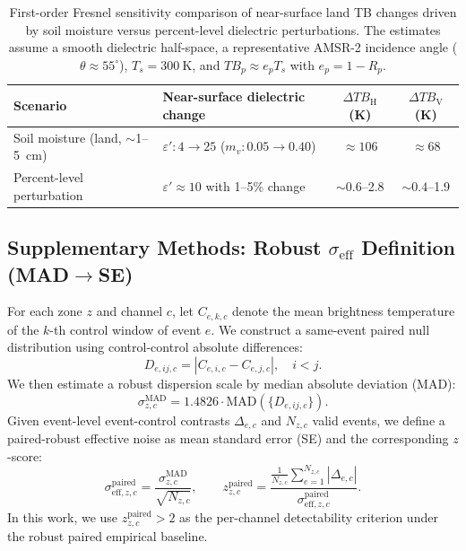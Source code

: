 \documentclass[preprint,review,12pt,authoryear]{elsarticle}
\begin{document}
\begin{table}[p]
\footnotesize
\centering
\caption{First-order Fresnel sensitivity comparison of near-surface land TB changes driven by soil moisture versus percent-level dielectric perturbations. The estimates assume a smooth dielectric half-space, a representative AMSR-2 incidence angle ($\theta \approx 55^{\circ}$), $T_s = 300~\mathrm{K}$, and $TB_p \approx e_p T_s$ with $e_p = 1 - R_p$.}
\label{tab:tableS5}
\begin{tabular}{@{}llcc@{}}
\toprule
Scenario & Near-surface dielectric change & $\Delta TB_{\mathrm{H}}$ (K) & $\Delta TB_{\mathrm{V}}$ (K) \\
\midrule
Soil moisture (land, $\sim$1--5~cm) & $\varepsilon': 4 \rightarrow 25$ ($m_v: 0.05 \rightarrow 0.40$) & $\approx 106$ & $\approx 68$ \\
Percent-level perturbation & $\varepsilon' \approx 10$ with 1--5\% change & $\sim 0.6$--2.8 & $\sim 0.4$--1.9 \\
\bottomrule
\end{tabular}
\end{table}
\clearpage


\clearpage


\clearpage

\subsection*{Supplementary Methods: Robust $\sigma_{\mathrm{eff}}$ Definition (MAD$\rightarrow$SE)}
For each zone $z$ and channel $c$, let $C_{e,k,c}$ denote the mean brightness temperature of the $k$-th control window of event $e$. We construct a same-event paired null distribution using control-control absolute differences:
\begin{equation}
D_{e,ij,c}=\left|C_{e,i,c}-C_{e,j,c}\right|,\quad i<j.
\end{equation}
We then estimate a robust dispersion scale by median absolute deviation (MAD):
\begin{equation}
\sigma^{\mathrm{MAD}}_{z,c}=1.4826\cdot \mathrm{MAD}\!\left(\{D_{e,ij,c}\}\right).
\end{equation}
Given event-level event-control contrasts $\Delta_{e,c}$ and $N_{z,c}$ valid events, we define a paired-robust effective noise as mean standard error (SE) and the corresponding $z$-score:
\begin{equation}
\sigma^{\mathrm{paired}}_{\mathrm{eff},z,c}=\frac{\sigma^{\mathrm{MAD}}_{z,c}}{\sqrt{N_{z,c}}},\qquad
z^{\mathrm{paired}}_{z,c}=\frac{\frac{1}{N_{z,c}}\sum_{e=1}^{N_{z,c}}\left|\Delta_{e,c}\right|}{\sigma^{\mathrm{paired}}_{\mathrm{eff},z,c}}.
\end{equation}
In this work, we use $z^{\mathrm{paired}}_{z,c}>2$ as the per-channel detectability criterion under the robust paired empirical baseline.


\clearpage


\clearpage


\clearpage


\clearpage
\end{document}
